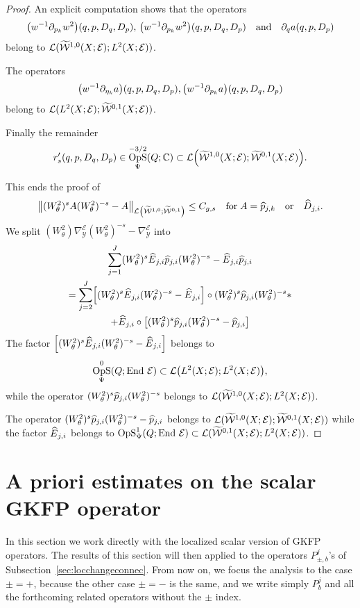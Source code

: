 \documentclass[10pt]{amsart}
\theoremstyle{definition}\newtheorem{defi}[theo]{Definition}\newtheorem{rema}[theo]{Remark}\newtheorem{exam}[theo]{Example}\newtheorem{exem}[theo]{Example}\newtheorem{nota}[theo]{Notation}
\newcommand{\C}{\mathbb{C}}
\newcommand{\clW}{\mathcal{W}}
\newcommand{\clY}{\mathcal{Y}}
\newcommand{\clE}{\mathcal{E}}
\newcommand{\clL}{\mathcal{L}}
\DeclareMathOperator{\End}{End}
\DeclareMathOperator{\OpS}{OpS}
\let\oldtilde\tilde
\renewcommand*{\tilde}[1]{\mathchoice{\widetilde{#1}}{\widetilde{#1}}{\oldtilde{#1}}{\oldtilde{#1}}}
\let\oldhat\hat
\renewcommand*{\hat}[1]{\mathchoice{\widehat{#1}}{\widehat{#1}}{\oldhat{#1}}{\oldhat{#1}}}
\let\originalleft\left
\let\originalright\right
\renewcommand{\left}{\mathopen{}\mathclose\bgroup\originalleft}
\renewcommand{\right}{\aftergroup\egroup\originalright}
\begin{document}
\begin{proof}
An explicit computation shows that the operators
\[
\left(w^{-1}\partial_{p_{k}}w^{2}\right)(q,p,D_{q},D_{p}),\, \left(w^{-1}\partial_{p_{k}}w^{2}\right)(q,p,D_{q},D_{p}) \quad\text{and}\quad \partial_{q}a(q,p,D_{p})
\]
belong to $\clL(\tilde{\clW}^{1,0}(X;\clE);L^{2}(X;\clE))$.

The operators
\[
\left(w^{-1}\partial_{\eta_{k}}a\right)(q,p,D_{q},D_{p}), \left(w^{-1}\partial_{p_{k}}a\right)(q,p,D_{q},D_{p})
\]
belong to $\clL(L^{2}(X;\clE);\tilde{\clW}^{0,1}(X;\clE))$.

Finally the remainder
\[
r_{s}'(q,p,D_{q},D_{p})\in \OpS^{-3/2}_{\Psi}(Q;\C)\subset \clL\left(\tilde{\clW}^{1,0}(X;\clE);\tilde{\clW}^{0,1}(X;\clE)\right).
\]

This ends the proof of
\[
\left\|(W^{2}_{\theta})^{s}A(W^{2}_{\theta})^{-s}-A\right\|_{\clL\left(\widetilde{\clW}^{1,0};\widetilde{\clW}^{0,1}\right)}\leq C_{g,s} \quad\text{for}\;A=\hat{p}_{j,k}\quad\text{or}\quad\hat{D}_{j,i}.
\]
We split $(W^{2}_{\theta})\nabla_{\clY}^{\clE}(W^{2}_{\theta})^{-s}-\nabla_{\clY}^{\clE}$ into
\begin{multline*}
\sum_{j=1}^{J}(W^{2}_{\theta})^{s}\hat{E}_{j,i}\hat{p}_{j,i}(W^{2}_{\theta})^{-s}-\hat{E}_{j,i}\hat{p}_{j,i}\\ =\sum_{j=2}^{J}\left[(W^{2}_{\theta})^{s}\hat{E}_{j,i}(W^{2}_{\theta})^{-s}-\hat{E}_{j,i}\right]\circ (W^{2}_{\theta})^{s}\hat{p}_{j,i}(W^{2}_{\theta})^{-s}*\\
+\hat{E}_{j,i}\circ \left[(W^{2}_{\theta})^{s}\hat{p}_{j,i}(W^{2}_{\theta})^{-s}-\hat{p}_{j,i}\right]
\end{multline*}
The factor $\left[(W^{2}_{\theta})^{s}\hat{E}_{j,i}(W^{2}_{\theta})^{-s}-\hat{E}_{j,i}\right]$ belongs to
\[
\OpS^{0}_{\Psi}(Q;\End\,\clE)\subset \clL\left(L^{2}(X;\clE);L^{2}(X;\clE)\right),
\]
while the operator $(W^{2}_{\theta})^{s}\hat{p}_{j,i}(W^{2}_{\theta})^{-s}$ belongs to $\clL(\tilde{\clW}^{1,0}(X;\clE);L^{2}(X;\clE))$.

The operator $(W^{2}_{\theta})^{s}\hat{p}_{j,i}(W^{2}_{\theta})^{-s}-\hat{p}_{j,i}$ belongs to $\clL(\tilde{\clW}^{1,0}(X;\clE);\tilde{\clW}^{0,1}(X;\clE))$ while the factor $\hat{E}_{j,i}$ belongs to $\OpS^{1}_{\Psi}(Q;\End\,\clE)\subset \clL(\tilde{\clW}^{0,1}(X;\clE);L^{2}(X;\clE))$.
\end{proof}
\section{A priori estimates on the scalar GKFP operator}\label{sec:localization}
In this section we work directly with the localized scalar version of GKFP operators. The results of this section will then applied to the operators $P_{\pm,b}^j$'s of Subsection~\ref{sec:locchangeconnec}. From now on, we focus the analysis to the case $\pm=+$, because the other case $\pm=-$ is the same, and we write simply $P_{b}^j$ and all the forthcoming related operators without the $\pm$ index.
\end{document}
